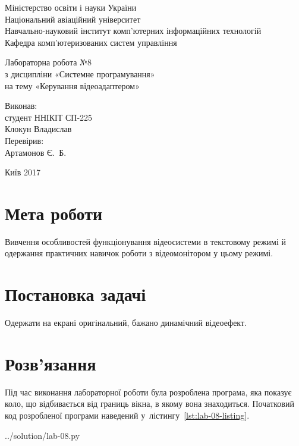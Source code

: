 \documentclass[a4paper,oneside,DIV=12,12pt]{scrartcl}
\begin{document}
	\begin{titlepage}
	\centering
		Міністерство освіти і науки України\\
		Національний авіаційний університет\\
		Навчально-науковий інститут комп'ютерних інформаційних технологій\\
		Кафедра комп'ютеризованих систем управління

		\vspace{\fill}

		Лабораторна робота №8\\
		з дисципліни «Системне програмування»\\
		на тему «Керування відеоадаптером»

		\vspace{\fill}
		
		\begin{flushright}
			Виконав:\\
			студент ННІКІТ СП-225\\
			Клокун Владислав\\
			Перевірив:\\
			Артамонов Є.~Б.
		\end{flushright}

		Київ 2017
    \end{titlepage}
	
	\section{Мета роботи}
		Вивчення особливостей функціонування відеосистеми в текстовому режимі й одержання практичних навичок роботи з відеомонітором у цьому режимі.
		
	\section{Постановка задачі}
		Одержати на екрані оригінальний, бажано динамічний відеоефект. 
		
	\section{Розв'язання}
		Під час виконання лабораторної роботи була розроблена програма, яка показує коло, що відбивається від границь вікна, в якому вона знаходиться. Початковий код розробленої програми наведений у~лістингу~\ref{lst:lab-08-listing}.
		
		
		{../solution/lab-08.py}
	
\end{document}
